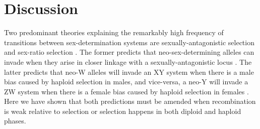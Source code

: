 \documentclass[12pt]{article}
\begin{document}
\section*{Discussion}


Two predominant theories explaining the remarkably high frequency of transitions between sex-determination systems are sexually-antagonistic selection and sex-ratio selection \citep[reviewed in][]{Blaser2012}.
The former predicts that neo-sex-determining alleles can invade when they arise in closer linkage with a sexually-antagonistic locus \citep{vanDoorn:2007eu,vanDoorn:2010hu}.
The latter predicts that neo-W alleles will invade an XY system when there is a male bias caused by haploid selection in males, and vice-versa, a neo-Y will invade a ZW system when there is a female bias caused by haploid selection in females \citep{Kozielska:2010vm,Ubeda:2015fx}.
Here we have shown that both predictions must be amended when recombination is weak relative to selection or selection happens in both diploid and haploid phases.
\end{document}
